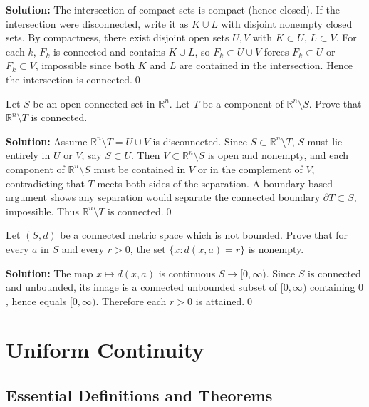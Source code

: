 \noindent\textbf{Solution:}
The intersection of compact sets is compact (hence closed). If the intersection were disconnected, write it as $K\cup L$ with disjoint nonempty closed sets. By compactness, there exist disjoint open sets $U,V$ with $K\subset U$, $L\subset V$. For each $k$, $F_k$ is connected and contains $K\cup L$, so $F_k\subset U\cup V$ forces $F_k\subset U$ or $F_k\subset V$, impossible since both $K$ and $L$ are contained in the intersection. Hence the intersection is connected.\qed



\begin{problembox}
Let $S$ be an open connected set in $\mathbb{R}^n$. Let $T$ be a component of $\mathbb{R}^n \setminus S$. Prove that $\mathbb{R}^n \setminus T$ is connected.
\end{problembox}

\noindent\textbf{Solution:}
Assume $\mathbb{R}^n\setminus T=U\cup V$ is disconnected. Since $S\subset\mathbb{R}^n\setminus T$, $S$ must lie entirely in $U$ or $V$; say $S\subset U$. Then $V\subset \mathbb{R}^n\setminus S$ is open and nonempty, and each component of $\mathbb{R}^n\setminus S$ must be contained in $V$ or in the complement of $V$, contradicting that $T$ meets both sides of the separation. A boundary-based argument shows any separation would separate the connected boundary $\partial T\subset S$, impossible. Thus $\mathbb{R}^n\setminus T$ is connected.\qed



\begin{problembox}
Let $(S, d)$ be a connected metric space which is not bounded. Prove that for every $a$ in $S$ and every $r > 0$, the set $\{x : d(x, a) = r\}$ is nonempty.
\end{problembox}

\noindent\textbf{Solution:}
The map $x\mapsto d(x,a)$ is continuous $S\to[0,\infty)$. Since $S$ is connected and unbounded, its image is a connected unbounded subset of $[0,\infty)$ containing $0$, hence equals $[0,\infty)$. Therefore each $r>0$ is attained.\qed

\section{Uniform Continuity}

\subsection*{Essential Definitions and Theorems}

